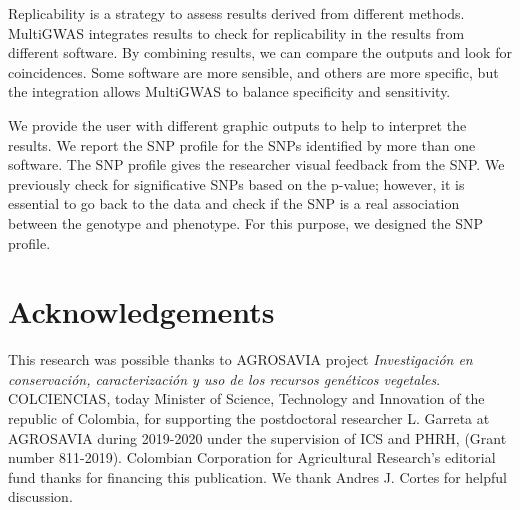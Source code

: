 \documentclass{article}
\begin{document}
Replicability is a strategy to assess results derived from different methods. MultiGWAS integrates results to check for replicability in the results from different software. By combining results, we can compare the outputs and look for coincidences. Some software are more sensible, and others are more specific, but the integration allows MultiGWAS to balance specificity and sensitivity.

We provide the user with different graphic outputs to help to interpret the results. We report the SNP profile for the SNPs identified by more than one software. The SNP profile gives the researcher visual feedback from the SNP. We previously check for significative SNPs based on the p-value; however, it is essential to go back to the data and check if the SNP is a real association between the genotype and phenotype. For this purpose, we designed the SNP profile. 

\section{Acknowledgements}
This research was possible thanks to AGROSAVIA project \emph{Investigación en conservación, caracterización y uso de los recursos genéticos vegetales}.
COLCIENCIAS, today Minister of Science, Technology and Innovation of the republic of Colombia, for supporting the postdoctoral researcher L. Garreta at AGROSAVIA during 2019-2020 under the supervision of ICS and PHRH, (Grant number 811-2019). Colombian Corporation for Agricultural Research's editorial fund thanks for financing this publication. We thank Andres J. Cortes for helpful discussion.



\end{document}
